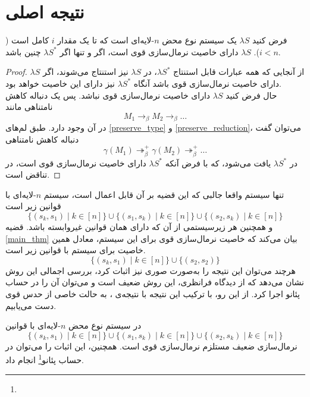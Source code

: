 \section{نتیجه اصلی}

\begin{thm}\label{main_thm}
فرض کنید
$\lambda S$
یک سیستم نوع محض
$n$-لایه‌ای
است که تا یک مقدار
$i$
کامل است ($i<n$).
$\lambda S$ دارای خاصیت نرمال‌سازی قوی است، اگر و تنها اگر $\lambda S^*$ چنین باشد.
\end{thm}

\begin{proof}
از آنجایی که همه عبارات قابل استنتاج
$\lambda S^*$، در $\lambda S$ نیز استنتاج می‌شوند،
اگر $\lambda S$ دارای خاصیت نرمال‌سازی قوی باشد آنگاه $\lambda S^*$ نیز دارای این خاصیت خواهد بود.\\
حال فرض کنید
$\lambda S$ دارای خاصیت نرمال‌سازی قوی نباشد. پس یک دنباله کاهش نامتناهی مانند
\begin{equation*}
M_1 \to_\beta M_2 \to_\beta \dots
\end{equation*}
در آن وجود دارد.
طبق لم‌های \ref{preserve_type} و \ref{preserve_reduction}، می‌توان گفت دنباله کاهش نامتناهی
\begin{equation*}
\gamma(M_1) \twoheadrightarrow^+_\beta \gamma(M_2) \twoheadrightarrow^+_\beta \dots
\end{equation*}
در
$\lambda S^*$
یافت می‌شود، که با فرض آنکه
$\lambda S^*$
دارای خاصیت نرمال‌سازی قوی است، در تناقض است.
\end{proof}

تنها سیستم واقعا جالبی که این قضیه بر آن قابل اعمال است، سیستم
$n$-لایه‌ای
با قوانین زیر است
\begin{equation*}
\{(s_k,s_1) \mid k \in [n]\} \cup \{(s_1,s_k) \mid k \in [n]\} \cup \{(s_2,s_k) \mid k \in [n]\}
\end{equation*}
و همچنین هر زیرسیستمی از آن که دارای همان قوانین غیروابسته باشد.
قضیه
\ref{main_thm}
بیان می‌کند که خاصیت نرمال‌سازی قوی برای این سیستم، معادل همین خاصیت برای سیستم با قوانین زیر است.
\begin{equation*}
\{(s_k,s_1) \mid k \in [n]\} \cup \{(s_2,s_2)\}
\end{equation*}
هرچند می‌توان این نتیجه را به‌صورت صوری نیز اثبات کرد، بررسی اجمالی این روش نشان می‌دهد که از دیدگاه فرا‌نظری، این روش ضعیف است و می‌توان آن را در حساب پئانو اجرا کرد.
از این‌ رو، با ترکیب این نتیجه با نتیجه‌ی
\cite{barthe2001}،
به حالت خاصی از حدس قوی
دست می‌یابیم.

\begin{cor}\label{cor}
در سیستم نوع محض
$n$-لایه‌ای
با قوانین
\begin{equation*}
\{(s_k,s_1) \mid k \in [n]\} \cup \{(s_1,s_k) \mid k \in [n]\} \cup \{(s_2,s_k) \mid k \in [n]\}
\end{equation*}
نرمال‌سازی ضعیف مستلزم نرمال‌سازی قوی است. همچنین، این اثبات را می‌توان در حساب پئانو\footnote{} انجام داد.
\end{cor}
